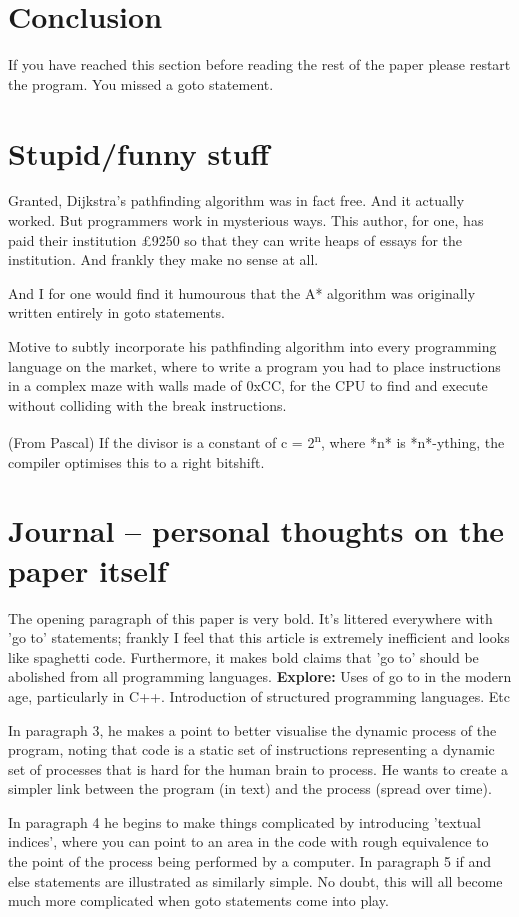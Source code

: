 \documentclass{journal}
\begin{document}
\section{Conclusion}
If you have reached this section before reading the rest of the paper please restart the program. You missed a goto statement.

\section{Stupid/funny stuff}
Granted, Dijkstra's pathfinding algorithm was in fact free. And it actually worked. But programmers work in mysterious ways. This author, for one, has paid their institution £9250 so that they can write heaps of essays for the institution. And frankly they make no sense at all.

And I for one would find it humourous that the A* algorithm was originally written entirely in goto statements.

Motive to subtly incorporate his pathfinding algorithm into every programming language on the market, where to write a program you had to place instructions in a complex maze with walls made of 0xCC, for the CPU to find and execute without colliding with the break instructions.

(From Pascal) If the divisor is a constant of c = 2\textsuperscript{n}, where *n* is *n*-ything, the compiler optimises this to a right bitshift.

\section{Journal -- personal thoughts on the paper itself}
The opening paragraph of this paper is very bold. It's littered everywhere with 'go to' statements; frankly I feel that this article is extremely inefficient and looks like spaghetti code. Furthermore, it makes bold claims that 'go to' should be abolished from all programming languages. \textbf{Explore:} Uses of go to in the modern age, particularly in C++. Introduction of structured programming languages. Etc

In paragraph 3, he makes a point to better visualise the dynamic process of the program, noting that code is a static set of instructions representing a dynamic set of processes that is hard for the human brain to process. He wants to create a simpler link between the program (in text) and the process (spread over time).

In paragraph 4 he begins to make things complicated by introducing 'textual indices', where you can point to an area in the code with rough equivalence to the point of the process being performed by a computer. In paragraph 5 if and else statements are illustrated as similarly simple. No doubt, this will all become much more complicated when goto statements come into play.
\end{document}

